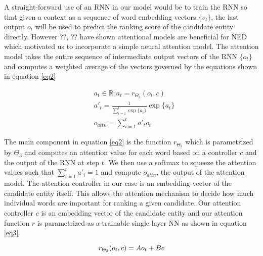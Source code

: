 \documentclass[11pt]{article}
\begin{document}
A straight-forward use of an RNN in our model would be to train the RNN so that given a context as a sequence of word embedding vectors $\{v_t\}$, the last output $o_t$ will be used to predict the ranking score of the candidate entity directly. However ??, ?? have shown attentional models are beneficial for NED which motivated us to incorporate a simple neural attention model. The attention model takes the entire sequence of intermediate output vectors of the RNN $\{o_t\}$ and computes a weighted average of the vectors governed by the equations shown in equation \ref{eq2}

\begin{equation}
	\label{eq2}
	\begin{aligned}
	& a_t \in \mathbb{R}; a_t=r_{\Theta_3}(o_t, c) \\
	& a'_t  = \frac{1}{\sum_{i=1}^{t} \exp\{a_i\}} \exp \{a_t\} \\
	& o_{attn}=\sum_{i=1}^{t} a'_t o_t
	\end{aligned}
\end{equation}

The main component in equation \ref{eq2} is the function $r_{\Theta_3}$ which is parametrized by $\Theta_3$ and computes an attention value for each word based on a controller $c$ and the output of the RNN at step $t$. We then use a softmax to squeeze the attention values such that $\sum_{i=1}^{t} a'_i = 1$ and compute $o_{attn}$, the output of the attention model. The attention controller in our case is an embedding vector of the candidate entity itself. This allows the attention mechanism to decide how much individual words are important for ranking a given candidate. Our attention controller $c$ is an embedding vector of the candidate entity and our attention function $r$ is parametrized as a trainable single layer NN as shown in equation \ref{eq3}

\begin{equation}
\label{eq3}
r_{\Theta_3}(o_t, c) = Ao_t + Bc \\
\end{equation}
\end{document}
